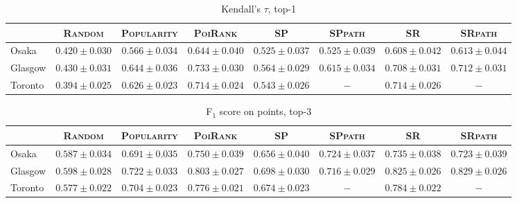 \begin{table*}[!h]
\caption{Kendall's $\tau$, top-1}
\centering
\small
\setlength{\tabcolsep}{4pt} %
\begin{tabular}{l|cc|cc|ccc} \hline
 & \textsc{Random} & \textsc{Popularity} & \textsc{PoiRank} & \textsc{SP} & \textsc{SPpath} & \textsc{SR} & \textsc{SRpath} \\ \hline
Osaka & $0.420\pm0.030$ & $0.566\pm0.034$ & $\mathbf{0.644\pm0.040}$ & $0.525\pm0.037$ & $0.525\pm0.039$ & $0.608\pm0.042$ & $\mathit{0.613\pm0.044}$ \\
Glasgow & $0.430\pm0.031$ & $0.644\pm0.036$ & $\mathbf{0.733\pm0.030}$ & $0.564\pm0.029$ & $0.615\pm0.034$ & $0.708\pm0.031$ & $\mathit{0.712\pm0.031}$ \\
Toronto & $0.394\pm0.025$ & $0.626\pm0.023$ & $\mathbf{0.714\pm0.024}$ & $0.543\pm0.026$ & $-$ & $\mathit{0.714\pm0.026}$ & $-$ \\
\hline
\end{tabular}
\end{table*}

\begin{table*}[!h]
\caption{F$_1$ score on points, top-3}
\centering
\small
\setlength{\tabcolsep}{4pt} %
\begin{tabular}{l|cc|cc|ccc} \hline
 & \textsc{Random} & \textsc{Popularity} & \textsc{PoiRank} & \textsc{SP} & \textsc{SPpath} & \textsc{SR} & \textsc{SRpath} \\ \hline
Osaka & $0.587\pm0.034$ & $0.691\pm0.035$ & $\mathbf{0.750\pm0.039}$ & $0.656\pm0.040$ & $0.724\pm0.037$ & $\mathit{0.735\pm0.038}$ & $0.723\pm0.039$ \\
Glasgow & $0.598\pm0.028$ & $0.722\pm0.033$ & $0.803\pm0.027$ & $0.698\pm0.030$ & $0.716\pm0.029$ & $\mathit{0.825\pm0.026}$ & $\mathbf{0.829\pm0.026}$ \\
Toronto & $0.577\pm0.022$ & $0.704\pm0.023$ & $\mathit{0.776\pm0.021}$ & $0.674\pm0.023$ & $-$ & $\mathbf{0.784\pm0.022}$ & $-$ \\
\hline
\end{tabular}
\end{table*}

